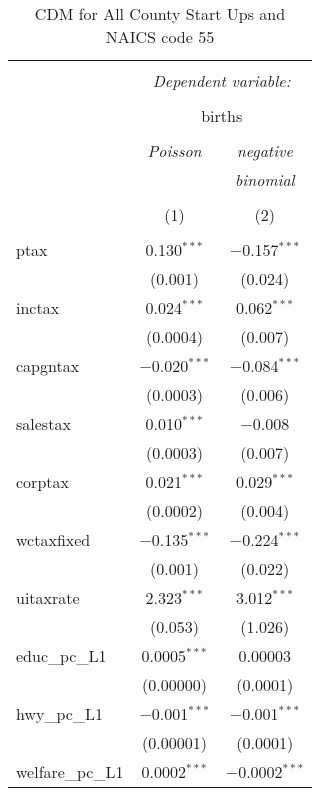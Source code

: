 
\begin{table}[!htbp] \centering 
  \caption{CDM for All County Start Ups and NAICS code 55} 
  \label{} 
\begin{tabular}{@{\extracolsep{5pt}}lcc} 
\\[-1.8ex]\hline 
\hline \\[-1.8ex] 
 & \multicolumn{2}{c}{\textit{Dependent variable:}} \\ 
\cline{2-3} 
\\[-1.8ex] & \multicolumn{2}{c}{births} \\ 
\\[-1.8ex] & \textit{Poisson} & \textit{negative} \\ 
 & \textit{} & \textit{binomial} \\ 
\\[-1.8ex] & (1) & (2)\\ 
\hline \\[-1.8ex] 
 ptax & 0.130$^{***}$ & $-$0.157$^{***}$ \\ 
  & (0.001) & (0.024) \\ 
  inctax & 0.024$^{***}$ & 0.062$^{***}$ \\ 
  & (0.0004) & (0.007) \\ 
  capgntax & $-$0.020$^{***}$ & $-$0.084$^{***}$ \\ 
  & (0.0003) & (0.006) \\ 
  salestax & 0.010$^{***}$ & $-$0.008 \\ 
  & (0.0003) & (0.007) \\ 
  corptax & 0.021$^{***}$ & 0.029$^{***}$ \\ 
  & (0.0002) & (0.004) \\ 
  wctaxfixed & $-$0.135$^{***}$ & $-$0.224$^{***}$ \\ 
  & (0.001) & (0.022) \\ 
  uitaxrate & 2.323$^{***}$ & 3.012$^{***}$ \\ 
  & (0.053) & (1.026) \\ 
  educ\_pc\_L1 & 0.0005$^{***}$ & 0.00003 \\ 
  & (0.00000) & (0.0001) \\ 
  hwy\_pc\_L1 & $-$0.001$^{***}$ & $-$0.001$^{***}$ \\ 
  & (0.00001) & (0.0001) \\ 
  welfare\_pc\_L1 & 0.0002$^{***}$ & $-$0.0002$^{***}$ \\ 

\end{tabular}
\end{table}
